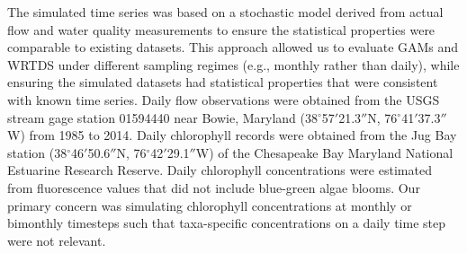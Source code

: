 \documentclass[letterpaper,12pt,oneside]{article}\usepackage[]{graphicx}\usepackage[]{color}
\begin{document}
The simulated time series was based on a stochastic model derived from actual flow and water quality measurements to ensure the statistical properties were comparable to existing datasets.  This approach allowed us to evaluate \acp{GAM} and \ac{WRTDS} under different sampling regimes (e.g., monthly rather than daily), while ensuring the simulated datasets had statistical properties that were consistent with known time series. Daily flow observations were obtained from the \ac{USGS} stream gage station 01594440 near Bowie, Maryland (38$^{\circ}$57$'$21.3$''$N, 76$^{\circ}$41$'$37.3$''$W) from 1985 to 2014.  Daily chlorophyll records were obtained from the Jug Bay station (38$^{\circ}$46$'$50.6$''$N, 76$^{\circ}$42$'$29.1$''$W) of the Chesapeake Bay Maryland National Estuarine Research Reserve.  Daily chlorophyll concentrations were estimated from fluorescence values that did not include blue-green algae blooms.  Our primary concern was simulating chlorophyll concentrations at monthly or bimonthly timesteps such that taxa-specific concentrations on a daily time step were not relevant.
\end{document}
